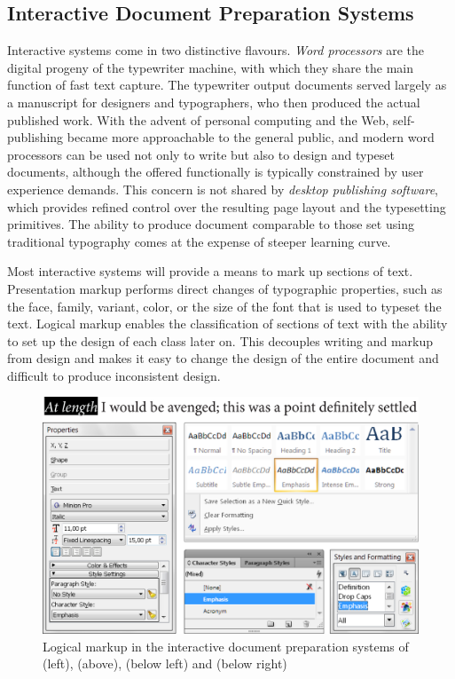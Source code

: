 \documentclass{book}
\begin{document}
\subsection{Interactive Document Preparation Systems}
Interactive systems come in two distinctive flavours. \emph{Word processors}
 are
the digital progeny of the typewriter machine, with which they share the main
function of fast text capture. The typewriter output documents served largely as
a manuscript for designers and typographers, who then produced the actual
published work. With the advent of personal computing and the Web,
self-publishing became more approachable to the general public, and modern word
processors can be used not only to write but also to design and typeset
documents, although the offered functionally is typically constrained by user
experience demands. This concern is not shared by \emph{desktop publishing
software},
which provides refined control over the resulting page layout and the
typesetting primitives. The ability to produce document comparable to those set
using traditional typography comes at the expense of steeper learning curve.

Most interactive systems will provide a means to mark up sections of text.
Presentation markup performs direct changes of typographic properties, such as
the face, family, variant, color, or the size of the font that is used to
typeset the text. Logical markup enables the classification of sections of text
with the ability to set up the design of each class later on. This decouples
writing and markup from design and makes it easy to change the design of the
entire document and difficult to produce inconsistent design.

\begin{figure}
  \includegraphics[width=\textwidth]{examples/02/interactive-editors.png}
  \caption{Logical markup in the interactive document preparation systems of
     (left),  (above), 
    (below left) and  (below right)}
\end{figure}
\end{document}
